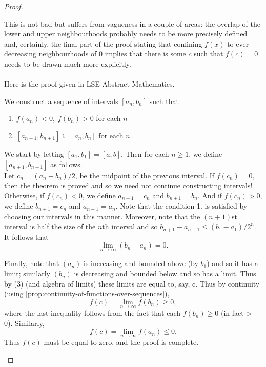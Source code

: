 \documentclass[../MathsNotesBase.tex]{subfiles}
\begin{document}
\begin{proof}
\begin{displayquote}
		\end{displayquote}
		This is not bad but suffers from vagueness in a couple of areas: the overlap of the lower and upper neighbourhoods probably needs to be more precisely defined and, certainly, the final part of the proof stating that confining $f(x)$ to ever-decreasing neighbourhoods of 0 implies that there is some $c$ such that ${ f(c) = 0 }$ needs to be drawn much more explicitly.\\\\
		Here is the proof given in LSE Abstract Mathematics.\\
		\begin{displayquote}
			We construct a sequence of intervals ${ [a_n, b_n] }$ such that
			\begin{enumerate}
				\item{${ f(a_n) < 0,\; f(b_n) > 0 }$ for each $ n $}
				\item{${ [a_{n+1}, b_{n+1}] \subseteq [a_n, b_n] }$ for each $ n $.}
			\end{enumerate}				
			We start by letting ${ [a_1, b_1] = [a, b]. }$ Then for each ${ n \geq 1 }$, we define ${ [a_{n+1}, b_{n+1}] }$ as follows.\\
			
			Let ${ c_n = (a_n + b_n)/2 }$, be the midpoint of the previous interval. If ${ f(c_n) = 0, }$ then the
			theorem is proved and so we need not continue constructing intervals!\\
			
			Otherwise, if ${ f(c_n) < 0 }$, we define ${ a_{n+1} = c_n }$ and ${ b_{n+1} = b_n }$. And if ${ f(c_n) > 0 }$, we define
			${ b_{n+1} = c_n }$ and ${ a_{n+1} = a_n }$. Note that the condition 1. is satisfied by choosing our intervals in this manner.
			Moreover, note that the ${ (n + 1) }$st interval is half the size of the $n$th interval and so
			${ b_{n+1} - a_{n+1} \leq (b_1 - a_1)/2^n }$. It follows that
			\[ \lim_{n \to \infty} (b_n - a_n) = 0.  \tag{3}\]
			
			Finally, note that $ (a_n) $ is increasing and bounded above (by $ b_1 $) and so it has a limit; similarly $ (b_n) $ is decreasing and bounded below and so has a limit. Thus by (3) (and algebra of limits) these limits are equal to, say, c. Thus by continuity (using \autoref{prop:continuity-of-functions-over-sequences}),
			\[ f(c) = \lim_{n \to \infty} f(b_n) \geq 0, \]
			where the last inequality follows from the fact that each ${ f(b_n) \geq 0 }$ (in fact > 0). Similarly,
			\[ f(c) = \lim_{n \to \infty} f(a_n) \leq 0. \]
			Thus $ f(c) $ must be equal to zero, and the proof is complete.
		\end{displayquote}
	\end{proof}
\end{document}
